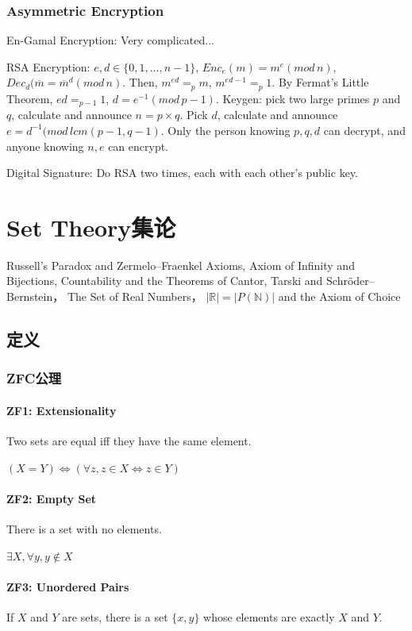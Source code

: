 \documentclass[12pt,a4paper]{ctexrep}
\begin{document}
\subsection{Asymmetric Encryption}
En-Gamal Encryption: Very complicated...%

RSA Encryption:
$e,d \in \{0,1,\dots,n-1\}$, $Enc_e(m) = m^e (mod\, n)$, $Dec_d(\overline{m} = \overline{m}^d (mod\, n)$. Then, $m^{ed} =_p m$, $m^{ed-1} =_p 1$. By Fermat's Little Theorem, $ed =_{p-1} 1$, $d = e^{-1} (mod\, p-1)$. Keygen: pick two large primes $p$ and $q$, calculate and announce $n = p \times q$. Pick $d$, calculate and announce $e = d^{-1} (mod\, lcm(p-1,q-1)$. Only the person knowing $p,q,d$ can decrypt, and anyone knowing $n,e$ can encrypt.

Digital Signature:
Do RSA two times, each with each other's public key.

\chapter{Set Theory集论}
Russell's Paradox and Zermelo–Fraenkel Axioms, Axiom of Infinity and Bijections, Countability and the Theorems of Cantor, Tarski and Schr\"oder–Bernstein， The Set of Real Numbers， $|\mathbb{R}|=|P(\mathbb{N})|$ and the Axiom of Choice
\section{定义}
\subsection{ZFC公理}
\subsubsection{ZF1: Extensionality}
Two sets are equal iff they have the same element.

$(X=Y) \iff (\forall z, z\in X \iff z\in Y)$

\subsubsection{ZF2: Empty Set}
There is a set with no elements.

$\exists X, \forall y, y \notin X$

\subsubsection{ZF3: Unordered Pairs}
If $X$ and $Y$ are sets, there is a set $\{x,y\}$ whose elements are exactly $X$ and $Y$.
\end{document}
